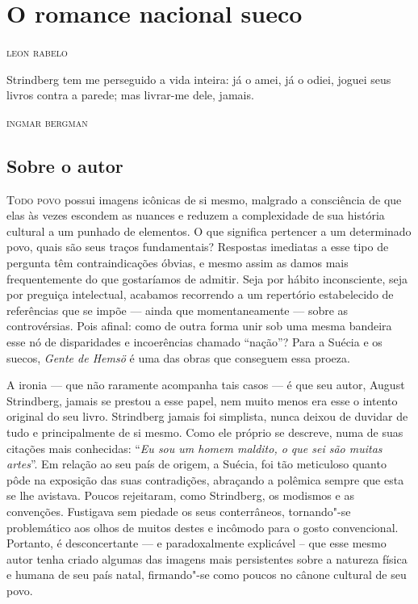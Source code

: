 \chapter{O romance nacional sueco}

\begin{flushright}
\textsc{leon rabelo}\bigskip
\end{flushright}

\epigraph{Strindberg tem me perseguido a vida inteira: já o amei, já o odiei, 
joguei seus livros contra a parede; mas livrar-me dele, jamais.}{\textsc{ingmar bergman}}

\section{Sobre o autor}


\noindent\textsc{Todo povo} possui imagens icônicas de si mesmo, 
malgrado a consciência de que elas às vezes escondem as nuances e 
reduzem a complexidade de sua história cultural a um punhado de elementos. 
O que significa pertencer a um determinado povo, quais são seus traços fundamentais? 
Respostas imediatas a esse tipo de pergunta têm contraindicações óbvias, e
mesmo assim as damos mais frequentemente do que gostaríamos de admitir.
Seja por hábito inconsciente, seja por preguiça intelectual, acabamos
recorrendo a um repertório estabelecido de referências que se impõe --- ainda que
momentaneamente --- sobre as controvérsias.  Pois afinal: como de outra
forma unir sob uma mesma bandeira esse nó de disparidades e
incoerências chamado “nação”?  Para a Suécia e os suecos, 
\textit{Gente de Hemsö} é uma das obras que conseguem essa proeza. 

A ironia --- que não raramente acompanha tais casos --- é que seu autor,
August Strindberg, jamais se prestou a esse papel, nem muito menos era
esse o intento original do seu livro. Strindberg jamais foi simplista,
nunca deixou de duvidar de tudo e principalmente de si mesmo. Como ele
próprio se descreve, numa de suas citações mais conhecidas: ``\textit{Eu
sou um homem maldito, o que sei são muitas artes}''. Em relação ao seu
país de origem, a Suécia, foi tão meticuloso quanto pôde na exposição
das suas contradições, abraçando a polêmica sempre que esta se lhe
avistava. Poucos rejeitaram, como Strindberg, os modismos e as
convenções. Fustigava sem piedade os seus conterrâneos, tornando"-se
problemático aos olhos de muitos destes e incômodo para o gosto
convencional. Portanto, é desconcertante --- e paradoxalmente explicável
– que esse mesmo autor tenha criado algumas das imagens mais
persistentes sobre a natureza física e humana de seu país natal, 
firmando"-se como poucos no cânone cultural de seu povo. 

